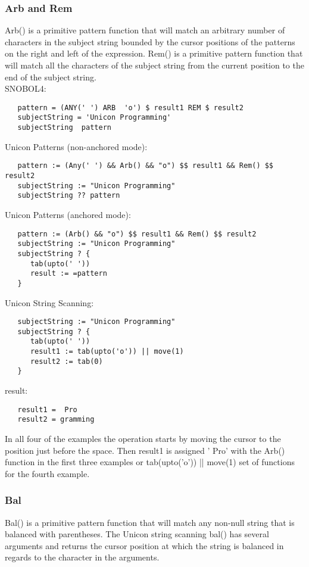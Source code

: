 \documentclass{article}
\begin{document}
\vspace{2 pc}
\subsubsection{Arb and Rem}
Arb() is a primitive pattern function that will match an arbitrary number of characters in the subject string bounded by the cursor positions of the patterns on the right and left of the expression.  Rem() is a primitive pattern function that will match all the characters of the subject string from the current position to the end of the subject string.\\

\noindent
SNOBOL4:
\begin{verbatim}
   pattern = (ANY(' ') ARB  'o') $ result1 REM $ result2
   subjectString = 'Unicon Programming'
   subjectString  pattern
\end{verbatim}

\noindent
Unicon Patterns (non-anchored mode):
\begin{verbatim}
   pattern := (Any(' ') && Arb() && "o") $$ result1 && Rem() $$ result2
   subjectString := "Unicon Programming"
   subjectString ?? pattern
\end{verbatim}
\noindent
Unicon Patterns (anchored mode):
\begin{verbatim}
   pattern := (Arb() && "o") $$ result1 && Rem() $$ result2
   subjectString := "Unicon Programming"
   subjectString ? {
      tab(upto(' '))
      result := =pattern
   }
\end{verbatim}

\noindent
Unicon String Scanning:
\begin{verbatim}
   subjectString := "Unicon Programming"
   subjectString ? {
      tab(upto(' '))
      result1 := tab(upto('o')) || move(1)
      result2 := tab(0)
   }
\end{verbatim}

\noindent
result:
\begin{verbatim}
   result1 =  Pro
   result2 = gramming
\end{verbatim}

In all four of the examples the operation starts by moving the cursor to the position just before the space.  Then result1 is assigned ' Pro' with the Arb() function in the first three examples or tab(upto('o')) || move(1) set of functions for the fourth example.

\vspace{2 pc}
\subsubsection{Bal}
Bal() is a primitive pattern function that will match any non-null string that is balanced with parentheses.  The Unicon string scanning bal() has several arguments and returns the cursor position at which the string is balanced in regards to the character in the arguments.\\
\end{document}
